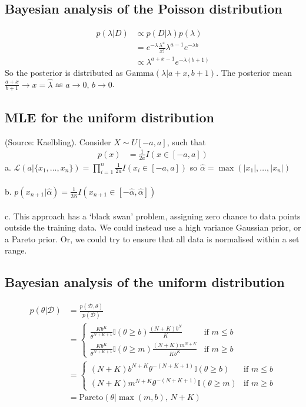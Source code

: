 \documentclass{article}
\begin{document}
\subsection{Bayesian analysis of the Poisson distribution}
\begin{align*}
p(\lambda|D) &\propto p(D|\lambda)p(\lambda)\\
&= e^{-\lambda}\frac{\lambda^x}{x!}\lambda^{a-1}e^{-\lambda b}\\
&\propto \lambda^{a+x-1}e^{-\lambda(b+1)}
\end{align*}
So the posterior is distributed as $\mathrm{Gamma}(\lambda|a+x,b+1)$. The posterior mean $\frac{a+x}{b+1} \rightarrow x = \hat\lambda$ as $a\rightarrow0,\,b\rightarrow0$.

\subsection{MLE for the uniform distribution}
(Source: Kaelbling). Consider $X \sim U[-a,a]$, such that
\begin{align*}
p(x) &= \frac{1}{2a}I(x\in[-a,a])
\end{align*}
a. $\mathcal{L}(a|\{x_1,\dots,x_n\}) = \prod_{i=1}^{n}\frac{1}{2a}I(x_i\in[-a,a])$ so $\hat\alpha=\max(|x_1|,\dots,|x_n|)$\\\\
b. $p(x_{n+1}|\hat\alpha) = \frac{1}{2\hat\alpha}I(x_{n+1}\in[-\hat\alpha, \hat\alpha])$\\\\
c. This approach has a `black swan' problem, assigning zero chance to data points outside the training data. We could instead use a high variance Gaussian prior, or a Pareto prior. Or, we could try to ensure that all data is normalised within a set range.

\subsection{Bayesian analysis of the uniform distribution}
\begin{align*}
p(\theta|\mathcal{D}) &= \frac{p(\mathcal{D},\theta)}{p(\mathcal{D})}\\
&= \begin{cases}
\frac{Kb^K}{\theta^{N+K+1}} \mathbb{I}(\theta\geq b) \frac{(N+K)b^N}{K} &\text{if $m\leq b$}\\
\frac{Kb^K}{\theta^{N+K+1}} \mathbb{I}(\theta\geq m) \frac{(N+K)m^{N+K}}{Kb^K} &\text{if $m\geq b$}
\end{cases}\\
&= \begin{cases}
(N+K)b^{N+K}\theta^{-(N+K+1)}\mathbb{I}(\theta\geq b) &\text{if $m\leq b$}\\
(N+K)m^{N+K}\theta^{-(N+K+1)}\mathbb{I}(\theta\geq m) &\text{if $m\geq b$}
\end{cases}\\
&= \mathrm{Pareto}(\theta|\max(m,b),\,N+K)
\end{align*}
\end{document}

